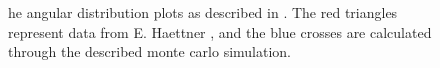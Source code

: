 \begin{figure}[!h]
{}
\label{fig:subfigureExample}
\caption[Optional caption for list of figures]{he angular distribution plots as described in \cite{AngularDistributionText}. The red triangles represent data from E. Haettner \cite{ehaettner}, and the blue crosses are calculated through the described monte carlo simulation.}
\end{figure}
\clearpage
